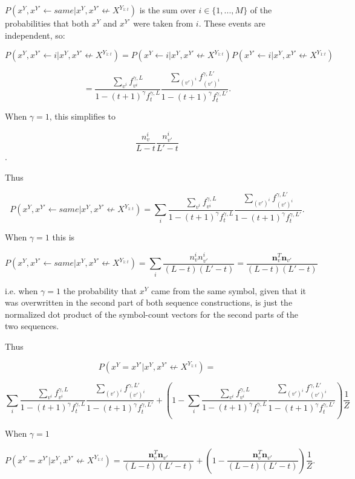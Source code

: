\documentclass{article}
\begin{document}
\begin{appendices}
$P(x^Y, x^{Y'} \leftarrow same|x^Y, x^{Y'} \not\leftarrow X^{Y_{1:t}})$ is the sum over $i \in \{1, ..., M\}$ of the probabilities that both $x^Y$ and $x^{Y'}$ were taken from $i$. These events are independent, so:

$$P(x^Y, x^{Y'} \leftarrow i|x^Y, x^{Y'} \not\leftarrow X^{Y_{1:t}}) = P(x^Y \leftarrow i|x^Y, x^{Y'} \not\leftarrow X^{Y_{1:t}})P(x^{Y'} \leftarrow i|x^Y, x^{Y'} \not\leftarrow X^{Y_{1:t}})$$

$$ = \frac{\sum\limits_{v^i} f_{v^i}^{\gamma,L}}{1 - (t+1)^\gamma f^{\gamma,L}_t} \frac{\sum\limits_{(v')^i} f^{\gamma,L'}_{(v')^i}}{1 - (t+1)^\gamma f^{\gamma,L'}_t}.$$

When $\gamma = 1$, this simplifies to

$$\frac{n^i_v}{L-t}\frac{n^i_{v'}}{L'-t}$$.

Thus

$$P(x^Y, x^{Y'} \leftarrow same|x^Y, x^{Y'} \not\leftarrow X^{Y_{1:t}}) = \sum_i \frac{\sum\limits_{v^i} f^{\gamma,L}_{v^i}}{1 - (t+1)^\gamma f^{\gamma,L}_t} \frac{\sum\limits_{(v')^i} f^{\gamma,L'}_{(v')^i}}{1 - (t+1)^\gamma f^{\gamma,L'}_t}.$$

When $\gamma = 1$ this is

$$P(x^Y, x^{Y'} \leftarrow same|x^Y, x^{Y'} \not\leftarrow X^{Y_{1:t}}) = \sum_i \frac{n^i_vn^i_{v'}}{(L-t)(L'-t)} = \frac{\mathbf{n}^T_v\mathbf{n}_{v'}}{(L-t)(L'-t)}$$

i.e. when $\gamma = 1$ the probability that $x^Y$ came from the same symbol, given that it was overwritten in the second part of both sequence constructions, is just the normalized dot product of the symbol-count vectors for the second parts of the two sequences.

Thus

$$P(x^Y = x^{Y'}|x^Y, x^{Y'} \not\leftarrow X^{Y_{1:t}}) = $$

$$\sum_i \frac{\sum\limits_{v^i} f^{\gamma,L}_{v^i}}{1 - (t+1)^\gamma f^{\gamma,L}_t} \frac{\sum\limits_{(v')^i} f^{\gamma,L'}_{(v')^i}}{1 - (t+1)^\gamma f^{\gamma,L'}_t} + \left(1 - \sum_i \frac{\sum\limits_{v^i} f^{\gamma,L}_{v^i}}{1 - (t+1)^\gamma f^{\gamma,L}_t} \frac{\sum\limits_{(v')^i} f^{\gamma,L'}_{(v')^i}}{1 - (t+1)^\gamma f^{\gamma,L'}_t}\right)\frac{1}{Z}$$

When $\gamma = 1$

$$P(x^Y = x^{Y'}|x^Y, x^{Y'} \not\leftarrow X^{Y_{1:t}}) = \frac{\mathbf{n}^T_v\mathbf{n}_{v'}}{(L-t)(L'-t)} + \left(1 - \frac{\mathbf{n}^T_v\mathbf{n}_{v'}}{(L-t)(L'-t)} \right)\frac{1}{Z}.$$


\end{appendices}
\end{document}
